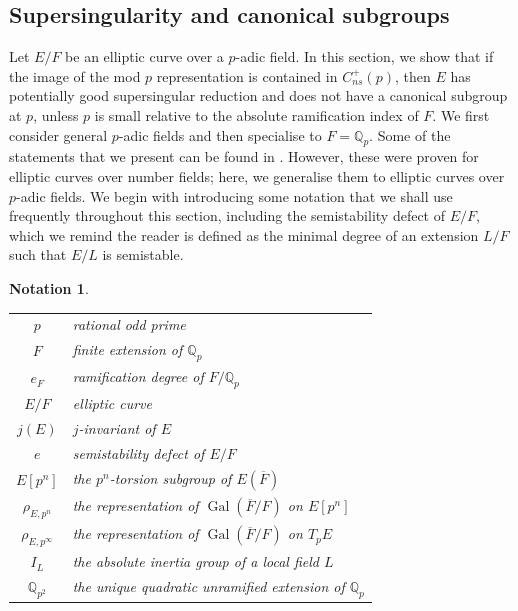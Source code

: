 \documentclass{amsart}
\newcommand{\Qp}{\mathbb{Q}_p}
\newtheorem*{notation*}{Notation}
\theoremstyle{definition}
\newcommand{\Q}{\mathbb{Q}}
\newcommand{\Gal}{\operatorname{Gal}}
\newcommand{\BaseField}{F}
\numberwithin{theorem}{section}
\numberwithin{equation}{section}
\begin{document}
\subsection{Supersingularity and canonical subgroups}

Let $E/\BaseField$ be an elliptic curve over a $p$-adic field. In this section, we show that if the image of the mod $p$ representation is contained in $C_{ns}^+(p)$, then $E$ has potentially good supersingular reduction and does not have a canonical subgroup at $p$, unless $p$ is small relative to the absolute ramification index of $\BaseField$. We first consider general $p$-adic fields and then specialise to $\BaseField=\Q_p$. 
Some of the statements that we present can be found in \cite[\S 4]{furio24}. However, these were proven for elliptic curves over number fields; here, we generalise them to elliptic curves over $p$-adic fields. We begin with introducing some notation that we shall use frequently throughout this section, including the semistability defect of $E/\BaseField$, which we remind the reader is defined as the minimal degree of an extension $L/F$ such that $E/L$ is semistable.

\vspace*{25pt}

\begin{notation*}
\phantom{~}

\begin{tabular}{cl}
   $p$ & rational odd prime \\
   $\BaseField$ & finite extension of $\Qp$ \\
   $e_\BaseField$ & ramification degree of $F/\Qp$ \\
   $E/\BaseField$ & elliptic curve \\
   $j(E)$ & $j$-invariant of $E$ \\
   $e$ & semistability defect of $E/\BaseField$ \\
   $E[p^n]$  & the $p^n$-torsion subgroup of $E(\overline{F})$ \\
   $\rho_{E,p^n}$ & the representation of $\Gal(\overline{F}/F)$ on $E[p^n]$ \\
   $\rho_{E,p^\infty}$ & the representation of $\Gal(\overline{F}/F)$ on $T_pE$ \\
   $I_L$ & the absolute inertia group of a local field $L$ \\
   $\Q_{p^2}$ & the unique quadratic unramified extension of $\Q_p$
\end{tabular}
\end{notation*}
\end{document}
